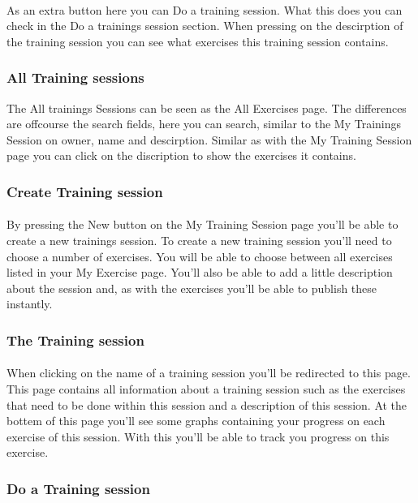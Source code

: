 \documentclass[11pt,a4paper]{scrartcl}
\begin{document}
\paragraph{}As an extra button here you can Do a training session. What this does you can check in the Do a trainings session section. When pressing on the descirption of the training session you can see what exercises this training session contains.
\subsubsection{All Training sessions}
The All trainings Sessions can be seen as the All Exercises page. The differences are offcourse the search fields, here you can search, similar to the My Trainings Session on owner, name and descirption. Similar as with the My Training Session page you can click on the discription to show the exercises it contains.

\subsubsection{Create Training session}
\paragraph{}By pressing the New button on the My Training Session page you'll be able to create a new trainings session. To create a new training session you'll need to choose a number of exercises. You will be able to choose between all exercises listed in your My Exercise page. You'll also be able to add a little description about the session and, as with the exercises you'll be able to publish these instantly.
\subsubsection{The Training session}
\paragraph{}When clicking on the name of a training session you'll be redirected to this page. This page contains all information about a training session such as the exercises that need to be done within this session and a description of this session. At the bottem of this page you'll see some graphs containing your progress on each exercise of this session. With this you'll be able to track you progress on this exercise.
\subsubsection{Do a Training session} 
\end{document}
